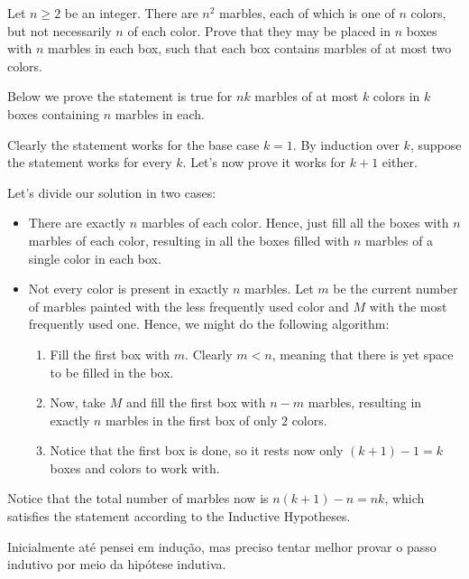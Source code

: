 \documentclass[12pt]{article}
\begin{document}
\begin{problem}
Let $n \ge 2$ be an integer.
There are $n^2$ marbles, each of which is one of $n$ colors,
but not necessarily $n$ of each color.
Prove that they may be placed in $n$ boxes
with $n$ marbles in each box,
such that each box contains marbles of at most two colors.
\end{problem}

Below we prove the statement is true for $nk$ marbles of at most $k$ colors in $k$ boxes containing $n$ marbles in each.

Clearly the statement works for the base case $k=1$. By induction over $k$, suppose the statement works for every $k$. Let's now prove it
works for $k+1$ either.

Let's divide our solution in two cases:
\begin{itemize}
	\item There are exactly $n$ marbles of each color. Hence, just fill all the boxes with $n$ marbles
	      of each color, resulting in all the boxes filled with $n$ marbles of a single color in each box.
	\item Not every color is present in exactly $n$ marbles. Let $m$ be the current number of marbles painted
	      with the less frequently used color and $M$ with the most frequently used one. Hence, we
	      might do the following algorithm:
	      \begin{enumerate}
		      \item Fill the first box with $m$. Clearly $m < n$, meaning that there is yet space to be filled in the box.
		      \item Now, take $M$ and fill the first box with $n-m$ marbles, resulting in exactly $n$ marbles in the first box of only $2$ colors.
		      \item Notice that the first box is done, so it rests now only $(k+1)-1=k$ boxes and colors to work with.
	      \end{enumerate}
\end{itemize}
Notice that the total number of marbles now is $n(k+1)-n=nk$, which satisfies the statement according to the Inductive Hypotheses.

\begin{insight}
	Inicialmente até pensei em indução, mas preciso tentar melhor provar o passo indutivo por meio da hipótese indutiva.
\end{insight}
\end{document}
